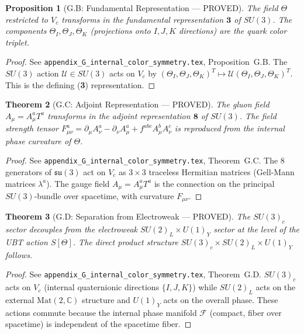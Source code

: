 \documentclass[12pt,a4paper]{article}
\newtheorem{theorem}{Theorem}[section]
\newtheorem{proposition}[theorem]{Proposition}
\theoremstyle{definition}
\theoremstyle{remark}
\begin{document}
\begin{proposition}[G.B: Fundamental Representation --- PROVED]
\label{prop:G_B}
The field $\Theta$ restricted to $V_c$ transforms in the fundamental
representation $\mathbf{3}$ of $SU(3)$.  The components $\Theta_I, \Theta_J, \Theta_K$
(projections onto $I, J, K$ directions) are the quark color triplet.
\end{proposition}

\begin{proof}
See \texttt{appendix\_G\_internal\_color\_symmetry.tex}, Proposition~G.B.
The $SU(3)$ action $\mathcal{U}\in SU(3)$ acts on $V_c$ by
$(\Theta_I, \Theta_J, \Theta_K)^T \mapsto \mathcal{U}(\Theta_I, \Theta_J, \Theta_K)^T$.
This is the defining (\textbf{3}) representation.
\end{proof}

\begin{theorem}[G.C: Adjoint Representation --- PROVED]
\label{thm:G_C}
The gluon field $A_\mu = A_\mu^a T^a$ transforms in the adjoint
representation $\mathbf{8}$ of $SU(3)$.  The field strength tensor
$F_{\mu\nu}^a = \partial_\mu A_\nu^a - \partial_\nu A_\mu^a + f^{abc}A_\mu^b A_\nu^c$
is reproduced from the internal phase curvature of $\Theta$.
\end{theorem}

\begin{proof}
See \texttt{appendix\_G\_internal\_color\_symmetry.tex}, Theorem~G.C.
The 8 generators of $\mathfrak{su}(3)$ act on $V_c$ as $3\times 3$
traceless Hermitian matrices (Gell-Mann matrices $\lambda^a$).  The
gauge field $A_\mu = A_\mu^a T^a$ is the connection on the principal
$SU(3)$-bundle over spacetime, with curvature $F_{\mu\nu}$.
\end{proof}

\begin{theorem}[G.D: Separation from Electroweak --- PROVED]
\label{thm:G_D}
The $SU(3)_c$ sector decouples from the electroweak $SU(2)_L\times U(1)_Y$
sector at the level of the UBT action $S[\Theta]$.
The direct product structure $SU(3)_c \times SU(2)_L \times U(1)_Y$ follows.
\end{theorem}

\begin{proof}
See \texttt{appendix\_G\_internal\_color\_symmetry.tex}, Theorem~G.D.
$SU(3)_c$ acts on $V_c$ (internal quaternionic directions $\{I,J,K\}$)
while $SU(2)_L$ acts on the external $\mathrm{Mat}(2,\mathbb{C})$ structure
and $U(1)_Y$ acts on the overall phase.  These actions commute because
the internal phase manifold $\mathcal{F}$ (compact, fiber over spacetime)
is independent of the spacetime fiber.
\end{proof}
\end{document}
